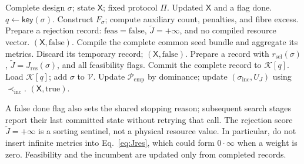 \documentclass[a4paper,onecolumn,11pt,unpublished]{quantumarticle}
\theoremstyle{remark}
\begin{document}
\begin{algorithm}[H]
\caption{Evaluate one complete design}
\label{alg:app-evaluate}
\begin{algorithmic}[1]
\Require Complete design $\sigma$; state $\mathsf X$; fixed protocol $\Pi$.
\Ensure Updated $\mathsf X$ and a flag $\mathrm{done}$.
\State $q\gets\mathsf{key}(\sigma)$.
    \State Construct $F_\sigma$; compute auxiliary count, penalties, and fibre excess.
        \State Prepare a rejection record: $\mathrm{feas}=\mathrm{false}$,
        $\widetilde J=+\infty$, and no compiled resource vector.
    \Else
            \State \Return $(\mathsf X,\mathrm{false})$.
        \EndIf
        \State Compile the complete common seed bundle and aggregate its metrics.
            \State Discard its temporary record; \Return $(\mathsf X,\mathrm{false})$.
        \EndIf
        \State Prepare a record with $r_{\mathrm{sel}}(\sigma)$,
        $\widetilde J=J_{\mathrm{res}}(\sigma)$, and all feasibility flags.
    \EndIf
    \State Commit the complete record to $\mathcal K[q]$.
\EndIf
\State Load $\mathcal K[q]$; add $\sigma$ to $\mathcal V$.
    \State Update $\mathcal P_{\mathrm{emp}}$ by dominance; update
    $(\sigma_{\mathrm{inc}},U_J)$ using $\prec_{\mathrm{inc}}$.
\EndIf
\State \Return $(\mathsf X,\mathrm{true})$.
\end{algorithmic}
\end{algorithm}

A false $\mathrm{done}$ flag also sets the shared stopping reason; subsequent
search stages report their last committed state without retrying that call.
The rejection score $\widetilde J=+\infty$ is a sorting sentinel, not a
physical resource value.  In particular, do not insert infinite metrics
into Eq.~\eqref{eq:Jres}, which could form $0\cdot\infty$ when a weight is zero.
Feasibility and the incumbent are updated only from completed records.
\end{document}
